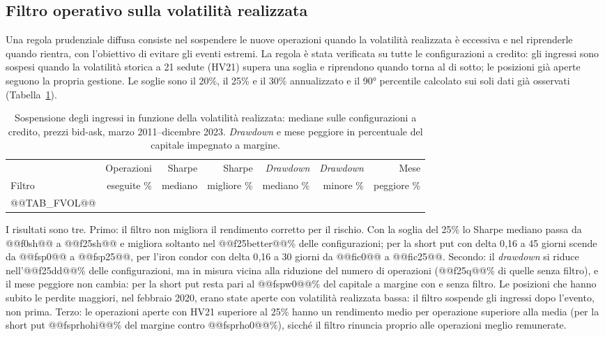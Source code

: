 \documentclass[11pt,a4paper]{article}
\begin{document}
\subsection{Filtro operativo sulla volatilità realizzata}\label{sec:fvol}

Una regola prudenziale diffusa consiste nel sospendere le nuove operazioni quando la volatilità realizzata è eccessiva e nel riprenderle quando rientra, con l'obiettivo di evitare gli eventi estremi. La regola è stata verificata su tutte le configurazioni a credito: gli ingressi sono sospesi quando la volatilità storica a 21 sedute (HV21) supera una soglia e riprendono quando torna al di sotto; le posizioni già aperte seguono la propria gestione. Le soglie sono il 20\%, il 25\% e il 30\% annualizzato e il 90° percentile calcolato sui soli dati già osservati (Tabella~\ref{tab:fvol}).

\begin{table}[ht]\centering\small
\caption{Sospensione degli ingressi in funzione della volatilità realizzata: mediane sulle configurazioni a credito, prezzi bid-ask, marzo 2011--dicembre 2023. \emph{Drawdown} e mese peggiore in percentuale del capitale impegnato a margine.}\label{tab:fvol}
\begin{tabular}{lrrrrrr}\toprule
 & Operazioni & Sharpe & Sharpe & \emph{Drawdown} & \emph{Drawdown} & Mese \\
Filtro & eseguite \% & mediano & migliore \% & mediano \% & minore \% & peggiore \% \\ \midrule
@@TAB_FVOL@@
\bottomrule\end{tabular}\end{table}

I risultati sono tre. Primo: il filtro non migliora il rendimento corretto per il rischio. Con la soglia del 25\% lo Sharpe mediano passa da @@f0sh@@ a @@f25sh@@ e migliora soltanto nel @@f25better@@\% delle configurazioni; per la short put con delta 0{,}16 a 45 giorni scende da @@fsp0@@ a @@fsp25@@, per l'iron condor con delta 0{,}16 a 30 giorni da @@fic0@@ a @@fic25@@. Secondo: il \emph{drawdown} si riduce nell'@@f25dd@@\% delle configurazioni, ma in misura vicina alla riduzione del numero di operazioni (@@f25q@@\% di quelle senza filtro), e il mese peggiore non cambia: per la short put resta pari al @@fspw0@@\% del capitale a margine con e senza filtro. Le posizioni che hanno subito le perdite maggiori, nel febbraio 2020, erano state aperte con volatilità realizzata bassa: il filtro sospende gli ingressi dopo l'evento, non prima. Terzo: le operazioni aperte con HV21 superiore al 25\% hanno un rendimento medio per operazione superiore alla media (per la short put @@fsprhohi@@\% del margine contro @@fsprho0@@\%), sicché il filtro rinuncia proprio alle operazioni meglio remunerate.
\end{document}
